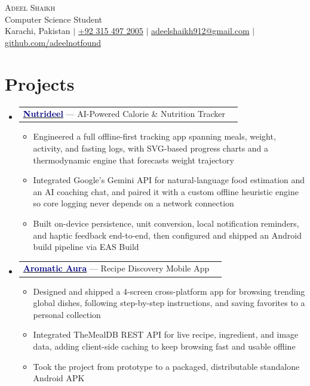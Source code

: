 \documentclass[letterpaper,11pt]{article}
\makeatletter
\newcommand{\resumeItem}[1]{
  \item\small{
    {#1}
  }
}
\newcommand{\resumeProjectHeading}[2]{
    \vspace{2pt}\item
    \begin{tabular*}{0.97\textwidth}{l@{\extracolsep{\fill}}r}
      \small#1 & \small\color{slate}#2 \\
    \end{tabular*}\vspace{-7pt}
}
\newcommand{\resumeSubHeadingListStart}{\begin{itemize}[leftmargin=0.15in, label={}, itemsep=-2pt, topsep=2pt]}
\newcommand{\resumeSubHeadingListEnd}{\end{itemize}}
\newcommand{\resumeItemListStart}{\begin{itemize}[leftmargin=0.15in, itemsep=1pt, topsep=1pt, parsep=0pt]}
\newcommand{\resumeItemListEnd}{\end{itemize}\vspace{-5pt}}
\makeatother
\begin{document}
\begin{center}
    {\Huge \scshape \color{navy} Adeel Shaikh} \\ \vspace{3pt}
    {\small \color{slate} Computer Science Student} \\ \vspace{4pt}
    \small Karachi, Pakistan\; $|$\; \href{tel:+923154972005}{+92 315 497 2005}\; $|$\;
    \href{mailto:adeelshaikh912@gmail.com}{adeelshaikh912@gmail.com}\; $|$\;
    \href{https://github.com/adeelnotfound}{github.com/adeelnotfound}
\end{center}
\vspace{-6pt}

\section{Projects}
    \resumeSubHeadingListStart
      \resumeProjectHeading
          {\href{https://github.com/adeelnotfound/Nutrideel/}{\textcolor{navy}{\textbf{Nutrideel}}} — AI-Powered Calorie \& Nutrition Tracker \normalfont{\textit{\, | \, React Native, Expo, TypeScript, Gemini API}}}{}
            \resumeItemListStart
            \resumeItem{Engineered a full offline-first tracking app spanning meals, weight, activity, and fasting logs, with SVG-based progress charts and a thermodynamic engine that forecasts weight trajectory}
            \resumeItem{Integrated Google's Gemini API for natural-language food estimation and an AI coaching chat, and paired it with a custom offline heuristic engine so core logging never depends on a network connection}
            \resumeItem{Built on-device persistence, unit conversion, local notification reminders, and haptic feedback end-to-end, then configured and shipped an Android build pipeline via EAS Build}
          \resumeItemListEnd
      \resumeProjectHeading
          {\href{https://github.com/adeelnotfound/Aromatic-Aura}{\textcolor{navy}{\textbf{Aromatic Aura}}} — Recipe Discovery Mobile App \normalfont{\textit{\, | \, React Native, Expo, TypeScript, TheMealDB API}}}{}
          \resumeItemListStart
            \resumeItem{Designed and shipped a 4-screen cross-platform app for browsing trending global dishes, following step-by-step instructions, and saving favorites to a personal collection}
            \resumeItem{Integrated TheMealDB REST API for live recipe, ingredient, and image data, adding client-side caching to keep browsing fast and usable offline}
            \resumeItem{Took the project from prototype to a packaged, distributable standalone Android APK}
          \resumeItemListEnd
    \resumeSubHeadingListEnd
\end{document}

